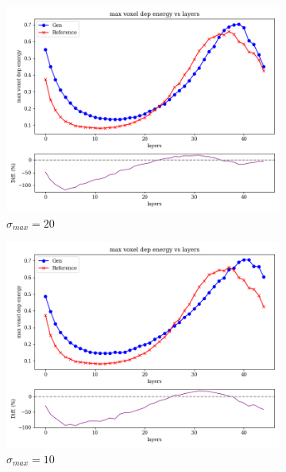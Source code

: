 \begin{figure}[bthp]
    \centering
    \begin{subfigure}[b]{0.23\textwidth}
        \centering
        \includegraphics[width=\textwidth]{Figures/ve20_5.png}
        \caption{$\sigma_{max}=20$}
        \label{fig:ve20_5}
    \end{subfigure}
    \hfill
    \begin{subfigure}[b]{0.23\textwidth}
        \centering
        \includegraphics[width=\textwidth]{Figures/ve10_5.png}
        \caption{$\sigma_{max}=10$}
        \label{fig:ve10_5}
    \end{subfigure}
    \hfill
    \begin{subfigure}[b]{0.23\textwidth}

\end{subfigure}
\end{figure}

